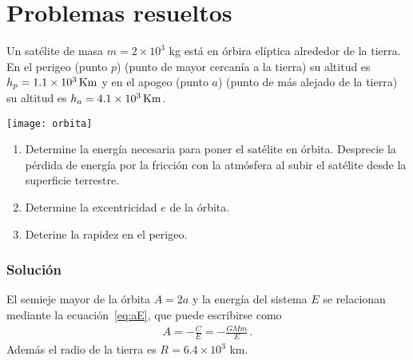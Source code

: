 \section{Problemas resueltos}

\ejemplo{}
Un satélite de masa $m=2 \times 10^3$ kg está en órbira elíptica alrededor de la tierra. En el perigeo (punto $p$) (punto de mayor cercanía a la tierra) su altitud es $h_p=\SI{1.1E3}{Km}$ y en el apogeo (punto $a$) (punto de más alejado de la tierra) su altitud es $h_a=\SI{4.1E3}{Km}$. 

\begin{frame}
  \begin{minipage}{0.44\linewidth}
    \texttt{[image: orbita]}
  \end{minipage}
  \begin{minipage}{0.55\linewidth}
    \begin{enumerate}
    \item Determine la energía necesaria para poner el satélite en órbita. Desprecie la pérdida de energía por la fricción con la atmósfera al subir el satélite desde la superficie terrestre.
      \label{item:c1a}
    \item Determine la excentricidad $e$ de la órbita.
      \label{item:c1b}
    \item Deterine la rapidez en el perigeo.
      \label{item:c1c}
    \end{enumerate}
  \end{minipage}
\end{frame}

\subsubsection*{Solución}
El  semieje mayor de la órbita $A=2a$ y la energía del sistema $E$ se relacionan mediante la ecuación~\eqref{eq:aE}, que puede escribirse como
\begin{align*}
  A=-\frac{C}{E}=-\frac{GMm}{E}\,.
\end{align*}
Además el radio de la tierra es $R=6.4 \times 10^3$ km. 


